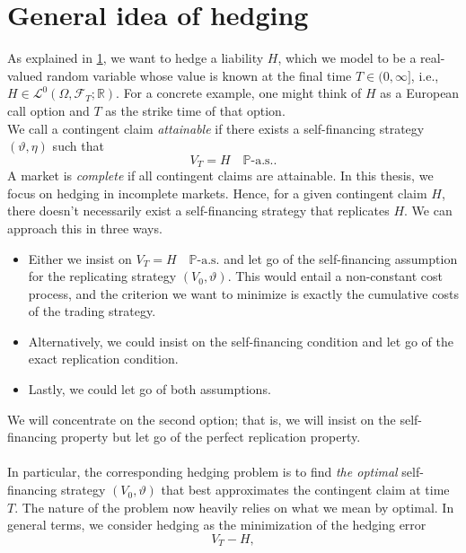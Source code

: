 \documentclass[11pt,a4paper,twoside,openany]{report}
\theoremstyle{plain} %
\theoremstyle{definition} %
\theoremstyle{remark} %
\begin{document}
\section{General idea of hedging}\label{sec:general idea of hedging}
As explained in \cref{sec:general idea of hedging}, we want to hedge a liability \(H\), which we model to be a real-valued random variable whose value is known at the final time \(T\in (0,\infty]\), i.e., \(H\in\mathcal{L}^0(\Omega,\mathcal{F}_T;\mathbb{R})\). For a concrete example, one might think of \(H\) as a European call option and \(T\) as the strike time of that option.
\\
We call a contingent claim \textit{attainable} if there exists a self-financing strategy \((\vartheta,\eta)\) such that
\begin{equation}\label{eq:atteinable strategy}
    V_T = H\quad \mathbb{P}\text{-a.s.}.
\end{equation}
A market is \textit{complete} if all contingent claims are attainable. In this thesis, we focus on hedging in incomplete markets. Hence, for a given contingent claim \(H\), there doesn't necessarily exist a self-financing strategy that replicates \(H\). We can approach this in three ways.
\begin{itemize}
    \item Either we insist on \(V_T = H\quad\mathbb{P}\text{-a.s.}\) and let go of the self-financing assumption for the replicating strategy \((V_0,\vartheta)\). This would entail a non-constant cost process, and the criterion we want to minimize is exactly the cumulative costs of the trading strategy.
    \item Alternatively, we could insist on the self-financing condition and let go of the exact replication condition.
    \item Lastly, we could let go of both assumptions.
\end{itemize}
We will concentrate on the second option; that is, we will insist on the self-financing property but let go of the perfect replication property. 
\\\\
In particular, the corresponding hedging problem is to find \textit{the optimal} self-financing strategy \((V_0,\vartheta)\) that best approximates the contingent claim at time \(T\). The nature of the problem now heavily relies on what we mean by optimal. In general terms, we consider hedging as the minimization of the hedging error 
\begin{equation}
    V_T-H,
\end{equation}
\end{document}
